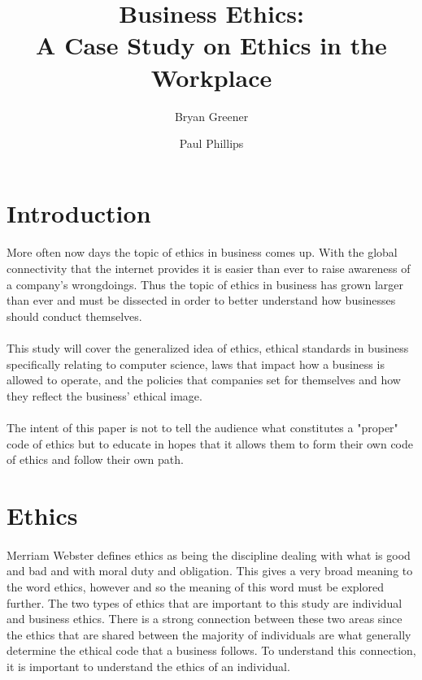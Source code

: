 \documentclass[notitlepage,a4paper,12pt]{article}
\author{Bryan Greener \and Paul Phillips}
\title{Business Ethics:\\A Case Study on Ethics in the Workplace}
\newcommand{\mychapter}[2]{
	\setcounter{chapter}{#1}
	\setcounter{section}{0}
	\chapter*{#2}
	\addcontentsline{toc}{chapter}{#2}
}
\begin{document}
\maketitle
\thispagestyle{empty}
\clearpage
\setcounter{page}{1}
\section*{Introduction}
\paragraph{}More often now days the topic of ethics in business comes up. With the global connectivity that the internet provides it is easier than ever to raise awareness of a company's wrongdoings. Thus the topic of ethics in business has grown larger than ever and must be dissected in order to better understand how businesses should conduct themselves.

\paragraph{}This study will cover the generalized idea of ethics, ethical standards in business specifically relating to computer science, laws that impact how a business is allowed to operate, and the policies that companies set for themselves and how they reflect the business' ethical image.

\paragraph{}The intent of this paper is not to tell the audience what constitutes a "proper" code of ethics but to educate in hopes that it allows them to form their own code of ethics and follow their own path.

\section*{Ethics}
\paragraph{}Merriam Webster defines ethics as being the discipline dealing with what is good and bad and with moral duty and obligation. This gives a very broad meaning to the word ethics, however and so the meaning of this word must be explored further. The two types of ethics that are important to this study are individual and business ethics. There is a strong connection between these two areas since the ethics that are shared between the majority of individuals are what generally determine the ethical code that a business follows. To understand this connection, it is important to understand the ethics of an individual.
\end{document}

